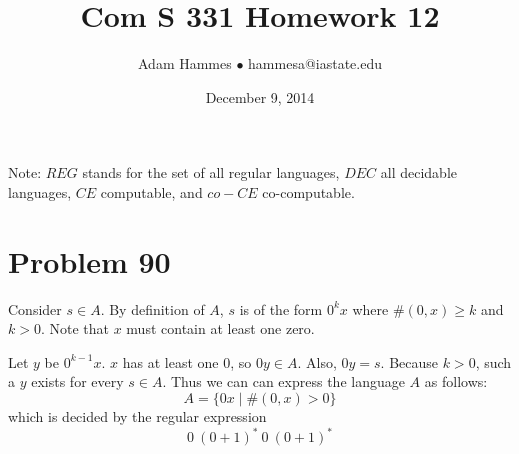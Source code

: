\documentclass[11pt]{article}
\begin{document}
\title{Com S 331 Homework 12}
\author{Adam Hammes $\bullet$ hammesa@iastate.edu}
\date{December 9, 2014}
\maketitle

Note: $REG$ stands for the set of all regular languages, $DEC$ all decidable languages, $CE$ computable, and $co-CE$ co-computable.


\section*{Problem 90}

Consider $s \in A$.
By definition of $A$, $s$ is of the form $0^kx$ where $\#(0,x) \geq k$ and $k>0$.
Note that $x$ must contain at least one zero.

Let $y$ be $0^{k-1}x$. $x$ has at least one 0, so $0y \in A$.
Also, $0y = s$.
Because $k >0$, such a $y$ exists for every $s \in A$.
Thus we can can express the language $A$ as follows:
	\[ A = \{0x \mid \#(0,x) > 0 \}\]
which is decided by the regular expression
	\[ 0\ (0+1)^*\ 0\ (0+1)^*\]
\end{document}
